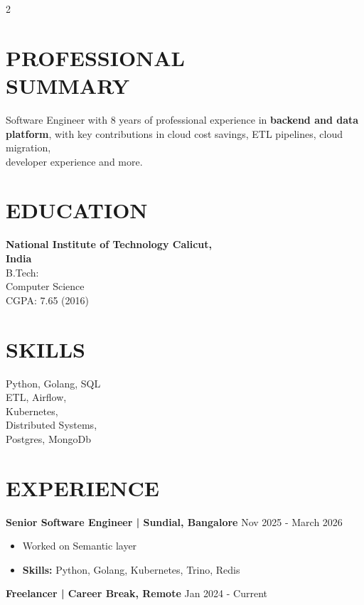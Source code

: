 \documentclass[a4paper,10pt]{article}
\newcommand{\experience}[2]{
  \vspace{0.8em}%
  \textbf{#1} \hfill #2
}
\begin{document}
\begin{paracol}{2}
\setlength{\columnsep}{1.2cm} %

\section*{PROFESSIONAL\\ SUMMARY}
Software Engineer with 8 years of professional experience in \textbf{backend and data platform}, with key contributions in cloud cost savings, ETL pipelines, cloud migration,\\ developer experience and more.

\section*{EDUCATION}
\textbf{National Institute of Technology Calicut, \\India} \\
B.Tech: \\
Computer Science \\
CGPA: 7.65 (2016)

\section*{SKILLS}
Python, Golang, SQL \\
ETL, Airflow, \\
Kubernetes, \\
Distributed Systems, \\
Postgres, MongoDb 



\switchcolumn

\section*{EXPERIENCE}
\experience{Senior Software Engineer | Sundial, Bangalore}{Nov 2025 - March 2026}
\vspace{0.2em}
\begin{itemize}
\setlength{\leftskip}{1em}
    \item Worked on Semantic layer
    \item \textbf{Skills:} Python, Golang, Kubernetes, Trino, Redis
\end{itemize}
\experience{Freelancer | Career Break, Remote}{Jan 2024 - Current}


\end{paracol}
\end{document}

